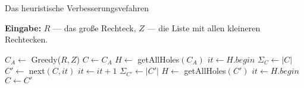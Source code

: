 \begin{algorithm}[h]
\caption{Das heuristische Verbesserungsvefahren}
\label{algo:verbesserung}
\flushleft
\textbf{Eingabe:} $R$ --- das große Rechteck, $Z$ --- die Liste mit allen kleineren Rechtecken.
\begin{algorithmic}[1]
\State $C_A \gets$ Greedy($R, Z$)
\State $C \gets C_A$
\State $H \gets$ getAllHoles$(C_A)$
\State $it \gets H.begin$
	\State $\Sigma_C \gets |C|$ 
	\State $C' \gets$ next$(C, it)$
	\State $it \gets it + 1$
	\State $\Sigma_{C'} \gets |C'|$
		\State $H \gets$ getAllHoles$(C')$
		\State $it \gets H.begin$
		\State $C \gets C'$
	\EndIf
\EndWhile
\end{algorithmic}
\end{algorithm}